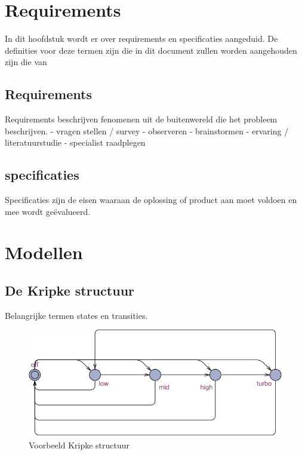 \documentclass{article}
\begin{document}
\section{Requirements}

In dit hoofdstuk wordt er over requirements en specificaties aangeduid. De definities voor deze termen zijn die in dit document zullen worden aangehouden zijn die van %

\subsection{Requirements}

Requirements beschrijven fenomenen uit de buitenwereld die het probleem beschrijven. \newline
- vragen stellen / survey \newline
- observeren \newline
- brainstormen \newline
- ervaring / literatuurstudie \newline
- specialist raadplegen \newline


\subsection{specificaties}

Specificaties zijn de eisen waaraan de oplossing of product aan moet voldoen en mee wordt geëvalueerd.

\section{Modellen}

\subsection{De Kripke structuur}

Belangrijke termen states en transities.

\begin{figure}[!h]
	\centering
	\includegraphics[width=\textwidth]{kripke_structure_example1}
    \caption{Voorbeeld Kripke structuur}
\end{figure}
\end{document}
